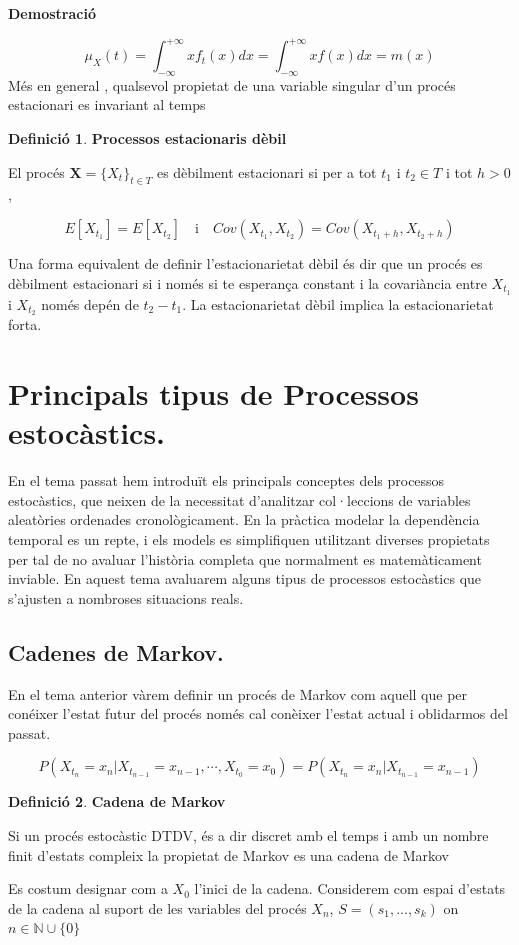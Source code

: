 \documentclass[
  catalan,
]{article}
\theoremstyle{definition}
\newtheorem{definition}{Definició}[section]
\theoremstyle{definition}
\theoremstyle{definition}
\theoremstyle{definition}
\theoremstyle{remark}
\begin{document}
\textbf{Demostració}

\[
\mu_X(t)=\int_{- \infty}^{+\infty} xf_t(x) dx=  \int_{- \infty}^{+\infty} xf(x) dx=m(x)
\]
Més en general , qualsevol propietat de una variable singular d'un procés estacionari es invariant al temps

\begin{definition}
\textbf{Processos estacionaris dèbil}

El procés \(\textbf{X}=\{X_t\}_{t \in T}\) es dèbilment estacionari si per a tot \(t_1\) i \(t_2 \in T\) i tot \(h>0\),

\[
E[X_{t_1}]=E[X_{t_2}] \quad \text{i}  \quad   Cov(X_{t_1},X_{t_2})= Cov(X_{t_1+h},X_{t_2+h})
\]
\end{definition}

Una forma equivalent de definir l'estacionarietat dèbil és dir que un procés es dèbilment estacionari si i només si te esperança constant i la covariància entre \(X_{t_1}\) i \(X_{t_2}\) només depén de \(t_2-t_1\). La estacionarietat dèbil implica la estacionarietat forta.

\section{Principals tipus de Processos estocàstics.}\label{principals-tipus-de-processos-estocuxe0stics.}

En el tema passat hem introduït els principals conceptes dels processos estocàstics, que neixen de la necessitat d'analitzar col·leccions de variables aleatòries ordenades cronològicament. En la pràctica modelar la dependència temporal es un repte, i els models es simplifiquen utilitzant diverses propietats per tal de no avaluar l'història completa que normalment es matemàticament inviable. En aquest tema avaluarem alguns tipus de processos estocàstics que s'ajusten a nombroses situacions reals.

\subsection{Cadenes de Markov.}\label{cadenes-de-markov.}

En el tema anterior vàrem definir un procés de Markov com aquell que per conéixer l'estat futur del procés només cal conèixer l'estat actual i oblidarmos del passat.

\[
P(X_{t_n}=x_n |X_{t_{n-1}}=x_{n-1}, \cdots ,X_{t_0}=x_0)=P(X_{t_n}=x_n|X_{t_{n-1}}=x_{n-1})
\]

\begin{definition}
\textbf{Cadena de Markov}

Si un procés estocàstic DTDV, és a dir discret amb el temps i amb un nombre finit d'estats compleix la propietat de Markov es una cadena de Markov

Es costum designar com a \(X_0\) l'inici de la cadena. Considerem com espai d'estats de la cadena al suport de les variables del procés \(X_n\), \(S=(s_1,...,s_k)\) on \(n \in \mathbb{N} \cup \{0\}\)
\end{definition}
\end{document}
